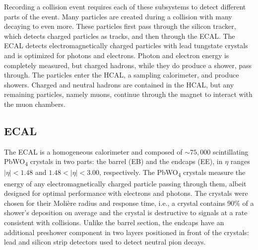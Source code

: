 \documentclass[12pt]{article}
\begin{document}
Recording a collision event requires each of these subsystems to detect different parts of the event. Many particles are created during a collision with many decaying to even more. These particles first pass through the silicon tracker, which detects charged particles as tracks, and then through the ECAL. The ECAL detects electromagnetically charged particles with lead tungstate crystals and is optimized for photons and electrons. Photon and electron energy is completely measured, but charged hadrons, while they do produce a shower, pass through. The particles enter the HCAL, a sampling calorimeter, and produce showers. Charged and neutral hadrons are contained in the HCAL, but any remaining particles, namely muons, continue through the magnet to interact with the muon chambers.\par

\subsection{ECAL}

The ECAL is a homogeneous calorimeter and composed of  ${\sim} 75,000$ scintillating PbWO\textsubscript{4} crystals in two parts: the barrel (EB) and the endcaps (EE), in $\eta$ ranges $|\eta| < 1.48$ and $1.48 < |\eta| < 3.00$, respectively. The PbWO\textsubscript{4} crystals measure the energy of any electromagnetically charged particle passing through them, albeit designed for optimal performance with electrons and photons. The crystals were chosen for their Moli\`ere radius and response time, i.e., a crystal contains 90\% of a shower's deposition on average and the crystal is destructive to signals at a rate consistent with collisions. Unlike the barrel section, the endcaps have an additional preshower component in two layers positioned in front of the crystals: lead and silicon strip detectors used to detect neutral pion decays.\par
\end{document}
